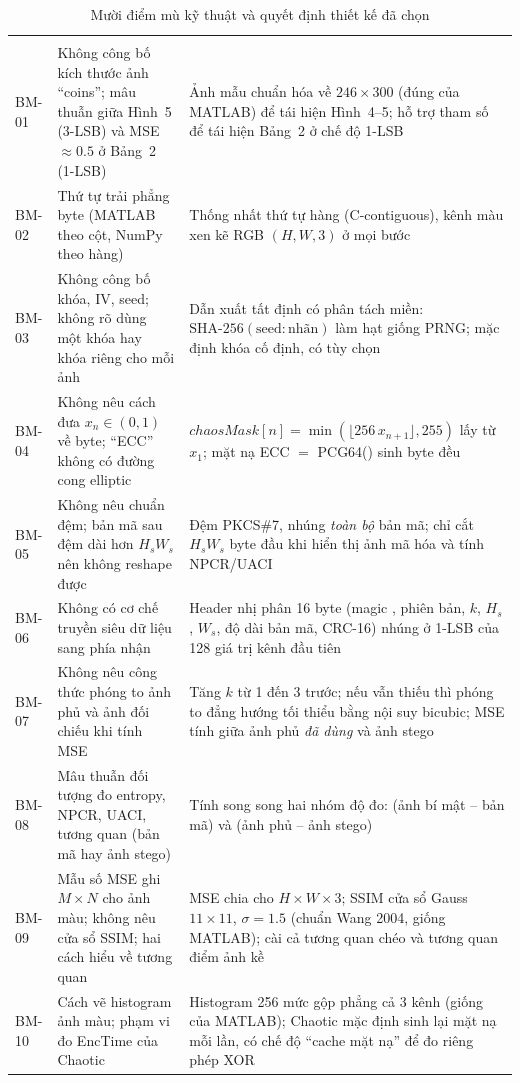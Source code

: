 {\small
\begin{longtable}{@{}P{1.3cm}P{5.6cm}P{8.1cm}@{}}
\caption{Mười điểm mù kỹ thuật và quyết định thiết kế đã chọn}
\label{tab:bm}\\
\toprule
{} &  & \\
\midrule
\endfirsthead
\toprule
{} &  & \\
\midrule
\endhead
\bottomrule
\endfoot
BM-01 & Không công bố kích thước ảnh ``coins''; mâu thuẫn giữa Hình~5 (3-LSB) và MSE $\approx 0.5$ ở Bảng~2 (1-LSB)
      & Ảnh mẫu chuẩn hóa về $246\times300$ (đúng  của MATLAB) để tái hiện Hình~4--5; hỗ trợ tham số  để tái hiện Bảng~2 ở chế độ 1-LSB\\
BM-02 & Thứ tự trải phẳng byte (MATLAB theo cột, NumPy theo hàng)
      & Thống nhất thứ tự hàng (C-contiguous), kênh màu xen kẽ RGB $(H, W, 3)$ ở mọi bước\\
BM-03 & Không công bố khóa, IV, seed; không rõ dùng một khóa hay khóa riêng cho mỗi ảnh
      & Dẫn xuất tất định có phân tách miền: $\mathrm{SHA\text{-}256}(\text{seed}:\text{nhãn})$ làm hạt giống PRNG; mặc định khóa cố định, có tùy chọn \\
BM-04 & Không nêu cách đưa $x_n \in (0,1)$ về byte; ``ECC'' không có đường cong elliptic
      & $\mathit{chaosMask}[n] = \min(\lfloor 256\,x_{n+1} \rfloor, 255)$ lấy từ $x_1$; mặt nạ ECC $=$ PCG64() sinh byte đều\\
BM-05 & Không nêu chuẩn đệm; bản mã sau đệm dài hơn $H_s W_s$ nên không reshape được
      & Đệm PKCS\#7, nhúng \emph{toàn bộ} bản mã; chỉ cắt $H_s W_s$ byte đầu khi hiển thị ảnh mã hóa và tính NPCR/UACI\\
BM-06 & Không có cơ chế truyền siêu dữ liệu sang phía nhận
      & Header nhị phân 16 byte (magic , phiên bản, $k$, $H_s$, $W_s$, độ dài bản mã, CRC-16) nhúng ở 1-LSB của 128 giá trị kênh đầu tiên\\
BM-07 & Không nêu công thức phóng to ảnh phủ và ảnh đối chiếu khi tính MSE
      & Tăng $k$ từ 1 đến 3 trước; nếu vẫn thiếu thì phóng to đẳng hướng tối thiểu bằng nội suy bicubic; MSE tính giữa ảnh phủ \emph{đã dùng} và ảnh stego\\
BM-08 & Mâu thuẫn đối tượng đo entropy, NPCR, UACI, tương quan (bản mã hay ảnh stego)
      & Tính song song hai nhóm độ đo:  (ảnh bí mật -- bản mã) và  (ảnh phủ -- ảnh stego)\\
BM-09 & Mẫu số MSE ghi $M\times N$ cho ảnh màu; không nêu cửa sổ SSIM; hai cách hiểu về tương quan
      & MSE chia cho $H\times W\times3$; SSIM cửa sổ Gauss $11\times11$, $\sigma = 1.5$ (chuẩn Wang 2004, giống MATLAB); cài cả tương quan chéo và tương quan điểm ảnh kề\\
BM-10 & Cách vẽ histogram ảnh màu; phạm vi đo EncTime của Chaotic
      & Histogram 256 mức gộp phẳng cả 3 kênh (giống  của MATLAB); Chaotic mặc định sinh lại mặt nạ mỗi lần, có chế độ ``cache mặt nạ'' để đo riêng phép XOR\\
\end{longtable}}

